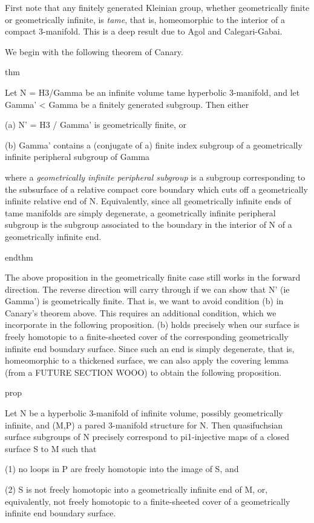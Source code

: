 First note that any finitely generated Kleinian group, whether geometrically
finite or geometrically infinite, is \emph{tame}, that is, homeomorphic to the
interior of a compact 3-manifold. This is a deep result due to Agol and
Calegari-Gabai.

We begin with the following theorem of Canary.

thm

Let N = H3/Gamma be an infinite volume tame hyperbolic 3-manifold, and let
Gamma' < Gamma be a finitely generated subgroup. Then either

(a) N' = H3 / Gamma' is geometrically finite, or

(b) Gamma' contains a (conjugate of a) finite index subgroup of a geometrically
infinite peripheral subgroup of Gamma

where a \emph{geometrically infinite peripheral subgroup} is a subgroup
corresponding to the subsurface of a relative compact core boundary which cuts
off a geometrically infinite relative end of N. Equivalently, since all
geometrically infinite ends of tame manifolds are simply degenerate,
a geometrically infinite peripheral subgroup is the subgroup associated to the
boundary in the interior of N of a geometrically infinite end.

endthm

The above proposition in the geometrically finite case still works in the
forward direction. The reverse direction will carry through if we can show that
N' (ie Gamma') is geometrically finite. That is, we want to avoid condition (b)
in Canary's theorem above. This requires an additional condition, which we
incorporate in the following proposition. (b) holds precisely when our surface
is freely homotopic to a finite-sheeted cover of the corresponding
geometrically infinite end boundary surface. Since such an end is simply
degenerate, that is, homeomorphic to a thickened surface, we can also apply the
covering lemma (from a FUTURE SECTION WOOO) to obtain the following
proposition.

prop

Let N be a hyperbolic 3-manifold of infinite volume, possibly geometrically
infinite, and (M,P) a pared 3-manifold structure for N. Then quasifuchsian
surface subgroups of N precisely correspond to pi1-injective maps of a closed
surface S to M such that

(1) no loops in P are freely homotopic into the image of S, and

(2) S is not freely homotopic into a geometrically infinite end of M, or,
equivalently, not freely homotopic to a finite-sheeted cover of a geometrically
infinite end boundary surface.

